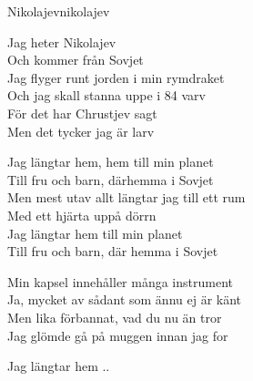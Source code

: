\begin{song}{Nikolajev}{nikolajev}
\begin{vers}
Jag heter Nikolajev\\
Och kommer från Sovjet\\
Jag flyger runt jorden i min rymdraket\\
Och jag skall stanna uppe i 84 varv\\
För det har Chrustjev sagt\\
Men det tycker jag är larv\\
\end{vers}
\begin{vers}
Jag längtar hem, hem till min planet\\
Till fru och barn, därhemma i Sovjet\\
Men mest utav allt längtar jag till ett rum\\
Med ett hjärta uppå dörrn\\
Jag längtar hem till min planet\\
Till fru och barn, där hemma i Sovjet\\
\end{vers}
\begin{vers}
Min kapsel innehåller många instrument\\
Ja, mycket av sådant som ännu ej är känt\\
Men lika förbannat, vad du nu än tror\\
Jag glömde gå på muggen innan jag for\\
\end{vers}
\begin{vers}
Jag längtar hem ..\\
\end{vers}
\end{song}
